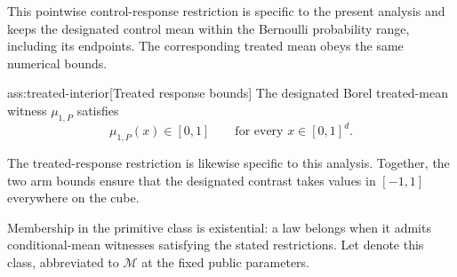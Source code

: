 This pointwise control-response restriction is specific to the present analysis and keeps the designated control mean within the Bernoulli probability range, including its endpoints. The corresponding treated mean obeys the same numerical bounds.

\begin{assumptionv}{ass:treated-interior}[Treated response bounds]
The designated Borel treated-mean witness \(\mu_{1,P}\) satisfies
\[
\mu_{1,P}(x)\in[0,1]
\qquad\text{for every }x\in[0,1]^d.
\]
\end{assumptionv}

The treated-response restriction is likewise specific to this analysis. Together, the two arm bounds ensure that the designated contrast takes values in \([-1,1]\) everywhere on the cube.

Membership in the primitive class is existential: a law belongs when it admits conditional-mean witnesses satisfying the stated restrictions. Let  denote this class, abbreviated to \(\mathcal M\) at the fixed public parameters.

